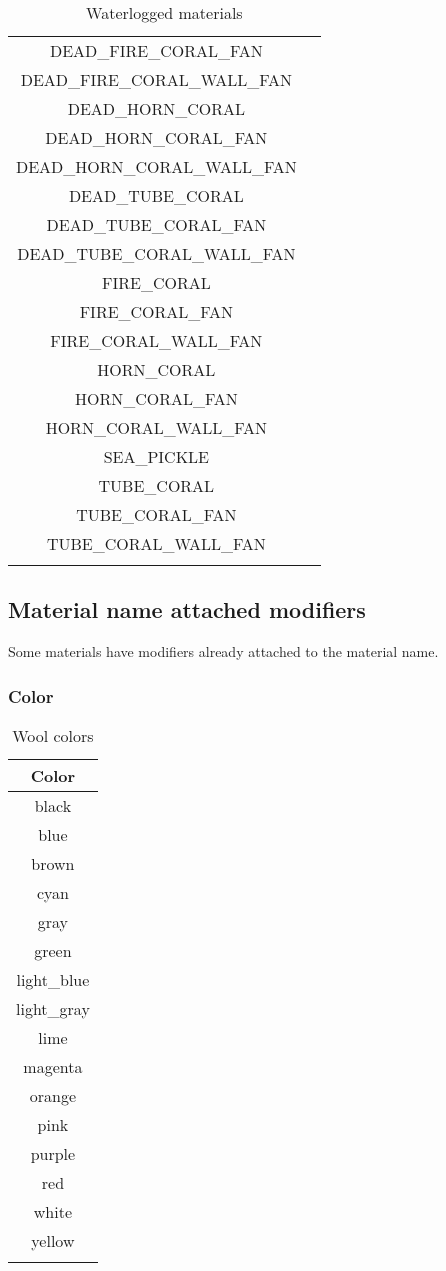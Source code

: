 \begin{longtable}{ |c|c| }
	DEAD\_FIRE\_CORAL\_FAN & \cmark \\
	DEAD\_FIRE\_CORAL\_WALL\_FAN & \cmark \\
	DEAD\_HORN\_CORAL & \cmark \\
	DEAD\_HORN\_CORAL\_FAN & \cmark \\
	DEAD\_HORN\_CORAL\_WALL\_FAN & \cmark \\
	DEAD\_TUBE\_CORAL & \cmark \\
	DEAD\_TUBE\_CORAL\_FAN & \cmark \\
	DEAD\_TUBE\_CORAL\_WALL\_FAN & \cmark \\
	FIRE\_CORAL & \cmark \\
	FIRE\_CORAL\_FAN & \cmark \\
	FIRE\_CORAL\_WALL\_FAN & \cmark \\
	HORN\_CORAL & \cmark \\
	HORN\_CORAL\_FAN & \cmark \\
	HORN\_CORAL\_WALL\_FAN & \cmark \\
	SEA\_PICKLE & \cmark \\
	TUBE\_CORAL & \cmark \\
	TUBE\_CORAL\_FAN & \cmark \\
	TUBE\_CORAL\_WALL\_FAN & \cmark \\
	\hline
	\caption{Waterlogged materials}
\end{longtable}


\subsection{Material name attached modifiers}
Some materials have modifiers already attached to the material name.

\subsubsection{Color}

\begin{longtable}{ |c| }
	\hline
	Color \\
	\hline
	\endhead
	black \\
	blue \\
	brown \\
	cyan \\
	gray \\
	green \\
	light\_blue \\
	light\_gray \\
	lime \\
	magenta \\
	orange \\
	pink \\
	purple \\
	red \\
	white \\
	yellow \\
	\hline
	\caption{Wool colors}
\end{longtable}

